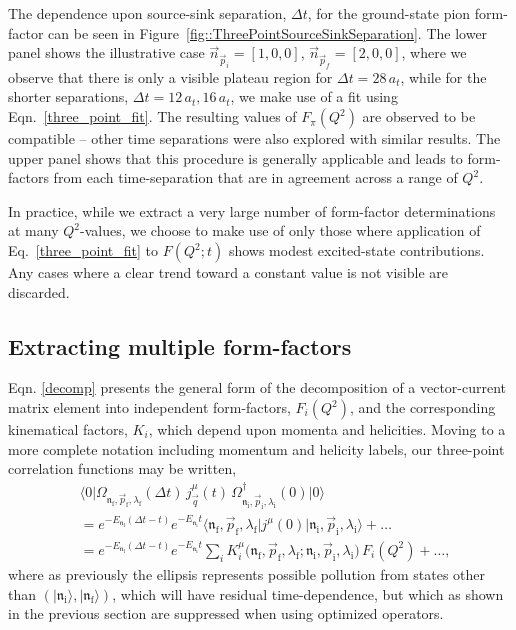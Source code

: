 \documentclass[twocolumn,amsmath,amssymb,prd,10pt,floatfix, 
superscriptaddress,nofootinbib, showpacs, preprintnumbers]{revtex4-1}
\begin{document}
The dependence upon source-sink separation, $\Delta t$, for the ground-state pion form-factor can be seen in Figure~\ref{fig::ThreePointSourceSinkSeparation}. The lower panel shows the illustrative case ${\vec{n}_{\vec{p}_i} = [1,0,0]}$, ${\vec{n}_{\vec{p}_f} = [2,0,0]}$, where we observe that there is only a visible plateau region for $\Delta t = 28\, a_t$, while for the shorter separations, $\Delta t = 12\, a_t, 16\, a_t$, we make use of a fit using Eqn.~\ref{three_point_fit}. The resulting values of $F_\pi(Q^2)$ are observed to be compatible -- other time separations were also explored with similar results. The upper panel shows that this procedure is generally applicable and leads to form-factors from each time-separation that are in agreement across a range of $Q^2$.

In practice, while we extract a very large number of form-factor determinations at many $Q^2$-values, we choose to make use of only those where application of Eq.~\ref{three_point_fit} to $F(Q^2;t)$ shows modest excited-state contributions. Any cases where a clear trend toward a constant value is not visible are discarded.




\subsection{Extracting multiple form-factors \label{sec::3pt_lin_sys}}


Eqn. \ref{decomp} presents the general form of the decomposition of a vector-current matrix element into independent form-factors, $F_i(Q^2)$, and the corresponding kinematical factors, $K_i$, which depend upon momenta and helicities. Moving to a more complete notation including momentum and helicity labels, our three-point correlation functions may be written, 
\begin{align}
&\!\!\big\langle 0 \big| \Omega^{\,}_{\mathfrak{n}_\mathrm{f},\vec{p}_\mathrm{f}, \lambda_\mathrm{f}}(\Delta t) \, j^\mu_{\vec{q}}(t) \, \Omega^\dag_{\mathfrak{n}_\mathrm{i},\vec{p}_\mathrm{i}, \lambda_\mathrm{i}}(0) \big| 0 \big\rangle \nonumber \\
&\!\!= e^{-E_{\mathfrak{n}_\mathrm{f}}(\Delta t - t)}  e^{-E_{\mathfrak{n}_\mathrm{i}}t}   
	 	\big\langle \mathfrak{n}_\mathrm{f}, \vec{p}_\mathrm{f}, \lambda_\mathrm{f} \big| j^\mu(0) \big| \mathfrak{n}_\mathrm{i},\vec{p}_\mathrm{i}, \lambda_\mathrm{i} \big\rangle + \ldots \nonumber \\
		&\!\!= e^{-E_{\mathfrak{n}_\mathrm{f}}(\Delta t - t)}  e^{-E_{\mathfrak{n}_\mathrm{i}}t} 
			  \!\sum_i \! K^\mu_i\big(\mathfrak{n}_\mathrm{f}, \vec{p}_\mathrm{f}, \lambda_\mathrm{f} ; \mathfrak{n}_\mathrm{i}, \vec{p}_\mathrm{i}, \lambda_\mathrm{i} \big) \, F_i(Q^2) + \ldots, \nonumber
\end{align}
where as previously the ellipsis represents possible pollution from states other than $(| \mathfrak{n}_\mathrm{i} \rangle, | \mathfrak{n}_\mathrm{f} \rangle)$, which will have residual time-dependence, but which as shown in the previous section are suppressed when using optimized operators.
\end{document}
